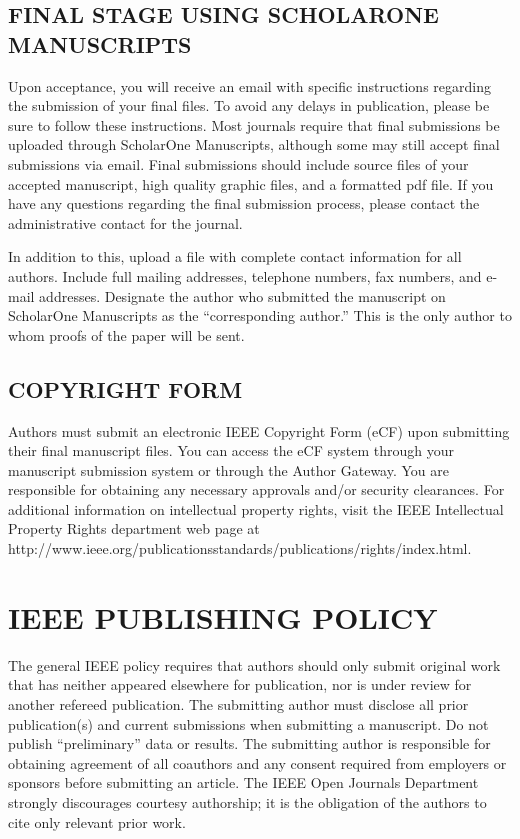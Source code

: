 \documentclass{IEEEoj}
\begin{document}
\subsection{FINAL STAGE USING SCHOLARONE MANUSCRIPTS}
Upon acceptance, you will receive an email with specific instructions 
regarding the submission of your final files. To avoid any delays in 
publication, please be sure to follow these instructions. Most journals 
require that final submissions be uploaded through ScholarOne Manuscripts, 
although some may still accept final submissions via email. Final 
submissions should include source files of your accepted manuscript, high 
quality graphic files, and a formatted pdf file. If you have any questions 
regarding the final submission process, please contact the administrative 
contact for the journal. 

In addition to this, upload a file with complete contact information for all 
authors. Include full mailing addresses, telephone numbers, fax numbers, and 
e-mail addresses. Designate the author who submitted the manuscript on 
ScholarOne Manuscripts as the ``corresponding author.'' This is the only 
author to whom proofs of the paper will be sent. 

\subsection{COPYRIGHT FORM}
Authors must submit an electronic IEEE Copyright Form (eCF) upon submitting 
their final manuscript files. You can access the eCF system through your 
manuscript submission system or through the Author Gateway. You are 
responsible for obtaining any necessary approvals and/or security 
clearances. For additional information on intellectual property rights, 
visit the IEEE Intellectual Property Rights department web page at 
http://www.ieee.org/publications\textunderscore\discretionary{}{}{}standards/publications/rights/index.html. 

\section{IEEE PUBLISHING POLICY}
The general IEEE policy requires that authors should only submit original 
work that has neither appeared elsewhere for publication, nor is under 
review for another refereed publication. The submitting author must disclose 
all prior publication(s) and current submissions when submitting a 
manuscript. Do not publish ``preliminary'' data or results. The submitting 
author is responsible for obtaining agreement of all coauthors and any 
consent required from employers or sponsors before submitting an article. 
The IEEE Open Journals Department strongly discourages courtesy authorship; 
it is the obligation of the authors to cite only relevant prior work.
\end{document}
